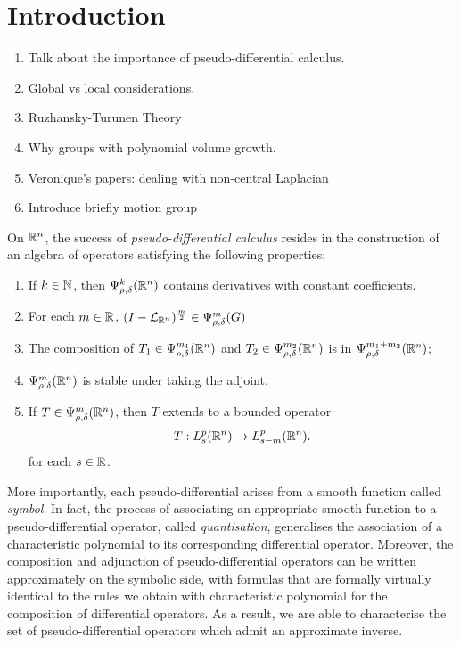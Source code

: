 \chapter{Introduction}

\begin{enumerate}
    \item Talk about the importance of pseudo-differential calculus.
    \item Global vs local considerations.
    \item Ruzhansky-Turunen Theory
    \item Why groups with polynomial volume growth.
    \item Veronique's papers: dealing with non-central Laplacian
    \item Introduce briefly motion group
\end{enumerate}

On $\R^n$,
the success of \emph{pseudo-differential calculus} resides in the construction of
an algebra of operators satisfying the following properties:
\begin{enumerate}
    \item If $k \in \N$, then $\OperatorClass [\R^n] k {\rho, \delta}$ contains derivatives with constant coefficients.
    \item For each $m \in \R$, $\BesselPotential [\R^n] m \in \OperatorClass m {\rho, \delta}$
    \item The composition of $T_1 \in \OperatorClass [\R^n] {m_1} {\rho, \delta}$ and $T_2 \in \OperatorClass [\R^n] {m_2} {\rho, \delta}$ is in $\OperatorClass [\R^n] {m_1 + m_2} {\rho, \delta}$;
    \item $\OperatorClass [\R^n] m {\rho, \delta}$ is stable under taking the adjoint.
    \item If $T \in \OperatorClass [\R^n] m {\rho, \delta}$,
        then $T$ extends to a bounded operator
        \begin{align*}
            T : \SobolevOrder [\R^n] p s \to \SobolevOrder [\R^n] p {s - m}.
        \end{align*}
        for each $s \in \R$.
\end{enumerate}

More importantly,
each pseudo-differential arises from a smooth function called \emph{symbol}.
In fact,
the process of associating an appropriate smooth function to a pseudo-differential operator,
called \emph{quantisation},
generalises the association of a characteristic polynomial to its corresponding differential operator.
Moreover,
the composition and adjunction of pseudo-differential operators can be written approximately on the symbolic side,
with formulas that are formally virtually identical to the rules we obtain with characteristic polynomial for the composition of differential operators.
As a result,
we are able to characterise the set of pseudo-differential operators which admit an approximate inverse.

